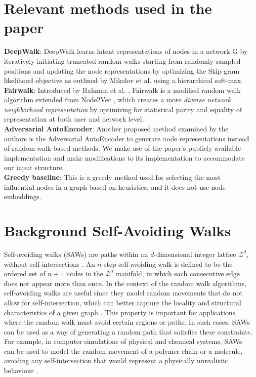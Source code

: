 \appendix
\newpage

\section{Relevant methods used in the paper}
\label{sec.models}

\textbf{DeepWalk}: DeepWalk \cite{deepwalk} learns latent representations of nodes in a network G by iteratively initiating truncated random walks starting from randomly sampled positions and updating the node representations by optimizing the Skip-gram likelihood objective as outlined by Mikolov et al. \cite{word_representations} using a hierarchical soft-max. \\

\textbf{Fairwalk}: Introduced by Rahman et al. \cite{fairwalk}, Fairwalk is a modified random walk algorithm extended from Node2Vec \cite{node2vec}, which creates a more \textit{diverse network neighborhood representation} by optimizing for statistical parity and equality of representation at both user and network level. \\

\textbf{Adversarial AutoEncoder}: Another proposed method examined by the authors is the Adversarial AutoEncoder \cite{aae} to generate node representations instead of random walk-based methods. We make use of the paper's publicly available implementation and make modifications to its implementation to accommodate our input structure. \\

\textbf{Greedy baseline}: This is a greedy method used for selecting the most influential nodes in a graph based on heuristics, and it does not use node embeddings.\\

\section{Background Self-Avoiding Walks}
\label{sec:saw}
Self-avoiding walks (SAWs) are paths within an $d$-dimensional integer lattice $\mathcal{Z}^{d}$, without self-intersections \cite{saw-1}. An $n$-step self-avoiding walk is defined to be the ordered set of $n+1$ nodes in the $\mathcal{Z}^{d}$ manifold, in which each consecutive edge does not appear more than once. In the context of the random walk algorithms, self-avoiding walks are useful since they model random movements that do not allow for self-intersection, which can better capture the locality and structural characteristics of a given graph \cite{saw-2}. This property is important for applications where the random walk must avoid certain regions or paths. In such cases, SAWs can be used as a way of generating a random path that satisfies these constraints. For example, in computer simulations of physical and chemical systems, SAWs can be used to model the random movement of a polymer chain or a molecule, avoiding any self-intersection that would represent a physically unrealistic behaviour \cite{saw-3}.

